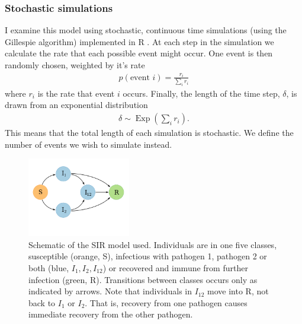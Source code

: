\subsubsection{Stochastic simulations}

I examine this model using stochastic, continuous time simulations (using the Gillespie algorithm) implemented in R \cite{R}.
At each step in the simulation we calculate the rate that each possible event might occur.
One event is then randomly chosen, weighted by it's rate
\begin{align}
  p(\text{event } i) = \frac{r_i}{\sum_i r_i}
\end{align}
where $r_i$ is the rate that event $i$ occurs.
Finally, the length of the time step, $\delta$, is drawn from an exponential distribution 
\begin{align}
  \delta \sim \operatorname{Exp}\left(\sum_i r_i  \right).
\end{align}
This means that the total length of each simulation is stochastic. 
We define the number of events we wish to simulate instead.


\begin{figure}[t]
\centering
  \includegraphics[width=0.4\textwidth]{imgs/SIRoption1.pdf}
  \caption[Schematic of the SIR model used]{
Schematic of the SIR model used. 
Individuals are in one five classes, susceptible (orange, S), infectious with pathogen 1, pathogen 2 or both (blue, $I_1, I_2, I_{12}$) or recovered and immune from further infection (green, R).
Transitions between classes occurs only as indicated by arrows.
Note that individuals in $I_{12}$ move into R, not back to $I_1$ or $I_2$. 
That is, recovery from one pathogen causes immediate recovery from the other pathogen.
}
  \label{f:sir}
\end{figure}



